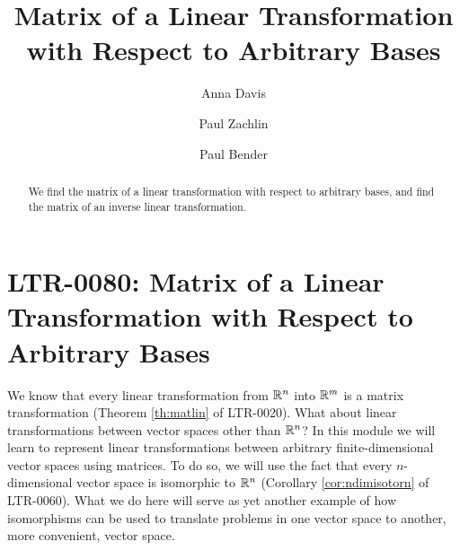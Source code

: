 \documentclass{ximera}
\author{Anna Davis \and Paul Zachlin \and Paul Bender} \title{Matrix of a Linear Transformation with Respect to Arbitrary Bases} \license{CC-BY 4.0}
\begin{document}
\begin{abstract}
  We find the matrix of a linear transformation with respect to arbitrary bases, and find the matrix of an inverse linear transformation.
\end{abstract}
\maketitle

\section*{LTR-0080: Matrix of a Linear Transformation with Respect to Arbitrary Bases}



We know that every linear transformation from $\mathbb{R}^n$ into $\mathbb{R}^m$ is a matrix transformation  (Theorem \ref{th:matlin} of LTR-0020).  What about linear transformations between vector spaces other than $\mathbb{R}^n$?  In this module we will learn to represent linear transformations between arbitrary finite-dimensional vector spaces using matrices.  To do so, we will use the fact that every $n$-dimensional vector space is isomorphic to $\mathbb{R}^n$  (Corollary \ref{cor:ndimisotorn} of LTR-0060).  What we do here will serve as yet another example of how isomorphisms can be used to translate problems in one vector space to another, more convenient, vector space.
\end{document}
